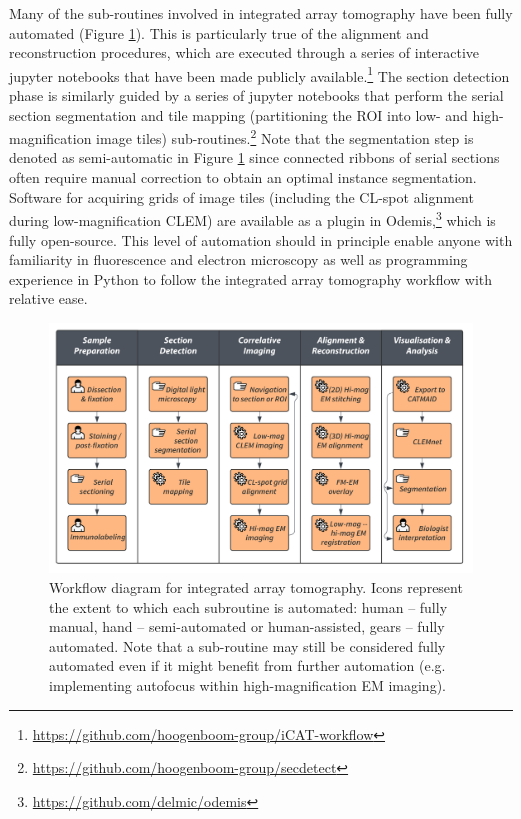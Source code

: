 Many of the sub-routines involved in integrated array tomography have been fully automated (Figure \ref{fig:5.1_workflow}). This is particularly true of the alignment and reconstruction procedures, which are executed through a series of interactive jupyter notebooks that have been made publicly available.\footnote{\href{https://github.com/hoogenboom-group/iCAT-workflow}{https://github.com/hoogenboom-group/iCAT-workflow}} The section detection phase is similarly guided by a series of jupyter notebooks that perform the serial section segmentation and tile mapping (partitioning the ROI into low- and high-magnification image tiles) sub-routines.\footnote{\href{https://github.com/hoogenboom-group/secdetect}{https://github.com/hoogenboom-group/secdetect}} Note that the segmentation step is denoted as semi-automatic in Figure \ref{fig:5.1_workflow} since connected ribbons of serial sections often require manual correction to obtain an optimal instance segmentation. Software for acquiring grids of image tiles (including the CL-spot alignment during low-magnification CLEM) are available as a plugin in Odemis,\footnote{\href{https://github.com/delmic/odemis}{https://github.com/delmic/odemis}} which is fully open-source. This level of automation should in principle enable anyone with familiarity in fluorescence and electron microscopy as well as programming experience in Python to follow the integrated array tomography workflow with relative ease.

\begin{figure}[!tb]
    \centering
    \includegraphics[width=\linewidth]{chapter-5/figures_PDF/fig5-1_workflow.pdf}
    \caption{Workflow diagram for integrated array tomography. Icons represent the extent to which each subroutine is automated: human -- fully manual, hand -- semi-automated or human-assisted, gears -- fully automated. Note that a sub-routine may still be considered fully automated even if it might benefit from further automation (e.g. implementing autofocus within high-magnification EM imaging).}
    \label{fig:5.1_workflow}
\end{figure}

